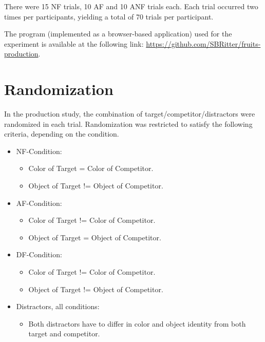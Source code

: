\documentclass[
]{article}
\providecommand{\tightlist}{%
  \setlength{\itemsep}{0pt}\setlength{\parskip}{0pt}}
\begin{document}
There were 15 NF trials, 10 AF and 10 ANF trials each.
Each trial occurred two times per participants, yielding a total of 70 trials per participant.

The program (implemented as a browser-based application) used for the experiment is available at the following link: \url{https://github.com/SBRitter/fruits-production}.

\appendix

\hypertarget{random}{%
\section{Randomization}\label{random}}

In the production study, the combination of target/competitor/distractors were randomized in each trial.
Randomization was restricted to satisfy the following criteria, depending on the condition.

\begin{itemize}
\tightlist
\item
  NF-Condition:

  \begin{itemize}
  \tightlist
  \item
    Color of Target = Color of Competitor.
  \item
    Object of Target != Object of Competitor.
  \end{itemize}
\item
  AF-Condition:

  \begin{itemize}
  \tightlist
  \item
    Color of Target != Color of Competitor.
  \item
    Object of Target = Object of Competitor.
  \end{itemize}
\item
  DF-Condition:

  \begin{itemize}
  \tightlist
  \item
    Color of Target != Color of Competitor.
  \item
    Object of Target != Object of Competitor.
  \end{itemize}
\item
  Distractors, all conditions:

  \begin{itemize}
  \tightlist
  \item
    Both distractors have to differ in color and object identity from both target and competitor.
  \end{itemize}
\end{itemize}
\end{document}
